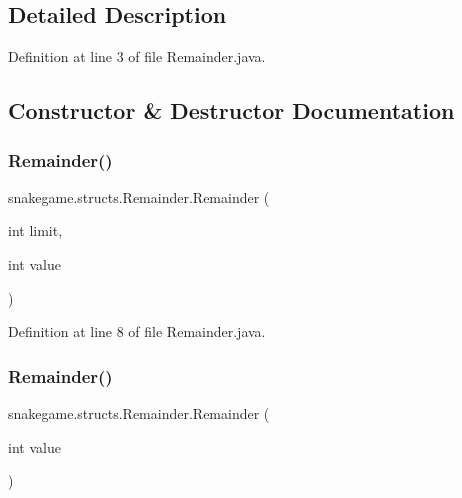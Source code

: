 \subsection{Detailed Description}


Definition at line 3 of file Remainder.\+java.



\subsection{Constructor \& Destructor Documentation}
\mbox{\label{classsnakegame_1_1structs_1_1_remainder_a5895859e2b9b2562a12a72495e316e9c}} 
\subsubsection{\texorpdfstring{Remainder()}{Remainder()}\hspace{0.1cm}{\footnotesize\ttfamily [1/2]}}
{\footnotesize\ttfamily snakegame.\+structs.\+Remainder.\+Remainder (\begin{DoxyParamCaption}\item[{int}]{limit,  }\item[{int}]{value }\end{DoxyParamCaption})}



Definition at line 8 of file Remainder.\+java.

\mbox{\label{classsnakegame_1_1structs_1_1_remainder_ad01229fb264baa7f39848cb0c6db8afa}} 
\subsubsection{\texorpdfstring{Remainder()}{Remainder()}\hspace{0.1cm}{\footnotesize\ttfamily [2/2]}}
{\footnotesize\ttfamily snakegame.\+structs.\+Remainder.\+Remainder (\begin{DoxyParamCaption}\item[{int}]{value }\end{DoxyParamCaption})}



